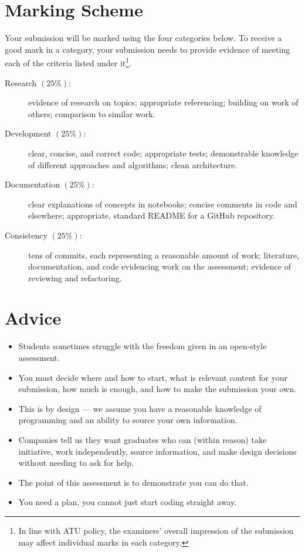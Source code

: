 \documentclass{iansnotes}
\begin{document}
\section{Marking Scheme}
Your submission will be marked using the four categories below.
To receive a good mark in a category, your submission needs to provide evidence of meeting each of the criteria listed under it\footnote{In line with ATU policy, the examiners' overall impression of the submission may affect individual marks in each category.}.

\begin{description}
  \item[Research $(25\%)$:] evidence of research on topics; appropriate referencing; building on work of others; comparison to similar work.
  \item[Development $(25\%)$:] clear, concise, and correct code; appropriate tests; demonstrable knowledge of different approaches and algorithms; clean architecture.
  \item[Documentation $(25\%)$:] clear explanations of concepts in notebooks; concise comments in code and elsewhere; appropriate, standard README for a GitHub repository.
  \item[Consistency $(25\%)$:] tens of commits, each representing a reasonable amount of work; literature, documentation, and code evidencing work on the assessment; evidence of reviewing and refactoring.
\end{description}


\section{Advice}

\begin{itemize}
  \item Students sometimes struggle with the freedom given in an open-style assessment.
  \item You must decide where and how to start, what is relevant content for your submission, how much is enough, and how to make the submission your own.
  \item This is by design --- we assume you have a reasonable knowledge of programming and an ability to source your own information.
  \item Companies tell us they want graduates who can (within reason) take initiative, work independently, source information, and make design decisions without needing to ask for help.
  \item The point of this assessment is to demonstrate you can do that.
  \item You need a plan, you cannot just start coding straight away.
\end{itemize}
\end{document}

